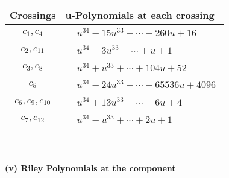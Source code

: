 \documentclass[1p]{elsarticle_modified}
\theoremstyle{definition}
\begin{document}
\begin{tabular}{m{50pt}|m{274pt}}
Crossings & \hspace{64pt}u-Polynomials at each crossing \\
\hline $$\begin{aligned}c_{1},c_{4}\end{aligned}$$&$\begin{aligned}
&u^{34}-15 u^{33}+\cdots-260 u+16
\end{aligned}$\\
\hline $$\begin{aligned}c_{2},c_{11}\end{aligned}$$&$\begin{aligned}
&u^{34}-3 u^{33}+\cdots+u+1
\end{aligned}$\\
\hline $$\begin{aligned}c_{3},c_{8}\end{aligned}$$&$\begin{aligned}
&u^{34}+u^{33}+\cdots+104 u+52
\end{aligned}$\\
\hline $$\begin{aligned}c_{5}\end{aligned}$$&$\begin{aligned}
&u^{34}-24 u^{33}+\cdots-65536 u+4096
\end{aligned}$\\
\hline $$\begin{aligned}c_{6},c_{9},c_{10}\end{aligned}$$&$\begin{aligned}
&u^{34}+13 u^{33}+\cdots+6 u+4
\end{aligned}$\\
\hline $$\begin{aligned}c_{7},c_{12}\end{aligned}$$&$\begin{aligned}
&u^{34}- u^{33}+\cdots+2 u+1
\end{aligned}$\\
\hline
\end{tabular}\\~\\
\newpage\renewcommand{\arraystretch}{1}
\flushleft \textbf{(v) Riley Polynomials at the component}\newline \\
\end{document}
